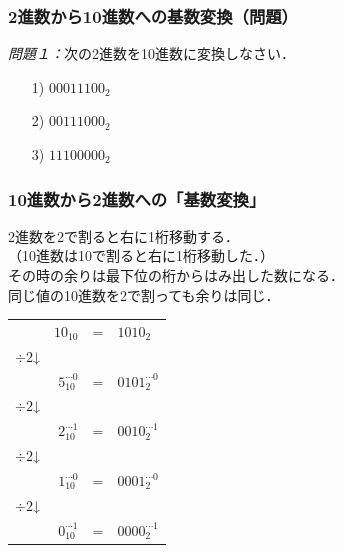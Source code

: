 \documentclass[handout]{beamer}        %
\begin{document}
\begin{frame}
  \frametitle{2進数から10進数への基数変換（問題）}

\emph{問題１：}次の2進数を10進数に変換しなさい．
\begin{enumerate}
\item[1)] $0001 1100_2$
\vfill
\item[2)] $0011 1000_2$
\vfill
\item[3)] $1110 0000_2$
\vfill
\end{enumerate}
\end{frame}

\begin{frame}
  \frametitle{10進数から2進数への「基数変換」}

  2進数を2で割ると右に1桁移動する．\\
  （10進数は10で割ると右に1桁移動した．）\\
  その時の余りは最下位の桁からはみ出した数になる．\\
  同じ値の10進数を2で割っても余りは同じ．

\begin{center}
\begin{tabular}{l r l l }
          & $10_{10}$ & = & $1010_2$                       \\
$\div 2$↓ &                   &                            \\
          & $5_{10}^{\cdots 0}$  & = & $0101_2^{\cdots 0}$ \\
$\div 2$↓ &                    &                           \\
          & $2_{10}^{\cdots 1}$  & = & $0010_2^{\cdots 1}$ \\
$\div 2$↓ &                    &                           \\
          & $1_{10}^{\cdots 0}$  & = & $0001_2^{\cdots 0}$ \\
$\div 2$↓ &                    &                           \\
          & $0_{10}^{\cdots 1}$  & = & $0000_2^{\cdots 1}$ \\
\end{tabular}
\end{center}
\end{frame}
\end{document}
